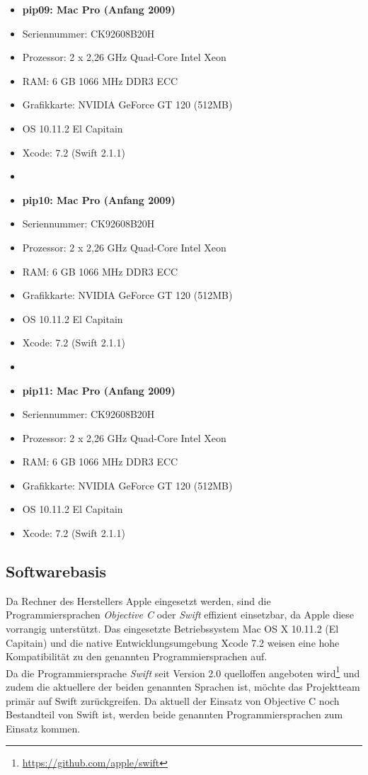 \begin{itemize}
	\item[] \textbf{pip09: Mac Pro (Anfang 2009)}
\item[] Seriennummer: CK92608B20H
	\item[] Prozessor: 	2 x 2,26 GHz Quad-Core Intel Xeon 
	\item[] RAM: 		6 GB 1066 MHz DDR3 ECC
	\item[] Grafikkarte: 	NVIDIA GeForce GT 120 (512MB)
	\item[] OS 10.11.2 El Capitain
	\item[] Xcode: 		7.2 (Swift 2.1.1)
	\item[] 
	\item[] \textbf{pip10: Mac Pro (Anfang 2009)}
	\item[] Seriennummer: CK92608B20H
	\item[] Prozessor: 	2 x 2,26 GHz Quad-Core Intel Xeon 
	\item[] RAM: 		6 GB 1066 MHz DDR3 ECC
	\item[] Grafikkarte: 	NVIDIA GeForce GT 120 (512MB)
	\item[] OS 10.11.2 El Capitain
	\item[] Xcode: 		7.2 (Swift 2.1.1)
	\item[] 
	\item[] \textbf{pip11: Mac Pro (Anfang 2009)}
	\item[] Seriennummer: CK92608B20H
	\item[] Prozessor: 	2 x 2,26 GHz Quad-Core Intel Xeon 
	\item[] RAM: 		6 GB 1066 MHz DDR3 ECC
	\item[] Grafikkarte: 	NVIDIA GeForce GT 120 (512MB)
	\item[] OS 10.11.2 El Capitain
	\item[] Xcode: 		7.2 (Swift 2.1.1)
\end{itemize}
 

\subsection{Softwarebasis}
\label{softwarebasis}
Da Rechner des Herstellers Apple eingesetzt werden, sind die Programmiersprachen \emph{Objective C} oder \emph{Swift} effizient einsetzbar, da Apple diese vorrangig unterstützt. Das eingesetzte Betriebssystem Mac OS X 10.11.2 (El Capitain) und die native Entwicklungsumgebung Xcode 7.2 weisen eine hohe Kompatibilität zu den genannten Programmiersprachen auf. \\
Da die Programmiersprache \emph{Swift} seit Version 2.0 quelloffen angeboten wird\footnote{\url{https://github.com/apple/swift}} und zudem die aktuellere der beiden genannten Sprachen ist, möchte das Projektteam primär auf Swift zurückgreifen. Da aktuell der Einsatz von Objective C noch Bestandteil von Swift ist, werden beide genannten Programmiersprachen zum Einsatz kommen. \\

